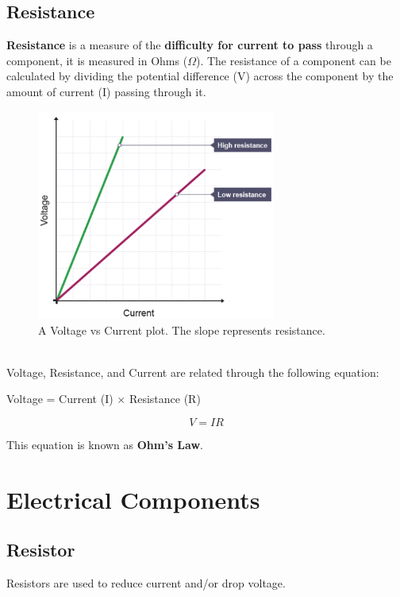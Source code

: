 \documentclass{article}
\begin{document}
\subsection{Resistance}

\textbf{Resistance} is a measure of the \textbf{difficulty for current to pass} through a component, it is measured in Ohms ($\Omega$). The resistance of a component can be calculated by dividing the potential difference (V) across the component by the amount of current (I) passing through it.
\\
\begin{figure}[h]
    \centering
    \includegraphics[width=0.7\textwidth]{img/VI_Curve.png}
    \caption{A Voltage vs Current plot. The slope represents resistance.}
    \label{fig:VI_Resistor}
\end{figure}
\\
Voltage, Resistance, and Current are related through the following equation: \\

\begin{center}
    Voltage = Current (I) $\times$ Resistance (R)
\end{center}
$$
V=IR
$$

This equation is known as \textbf{Ohm's Law}.

\section{Electrical Components}
\subsection{Resistor}
Resistors are used to reduce current and/or drop voltage.\\
\end{document}
